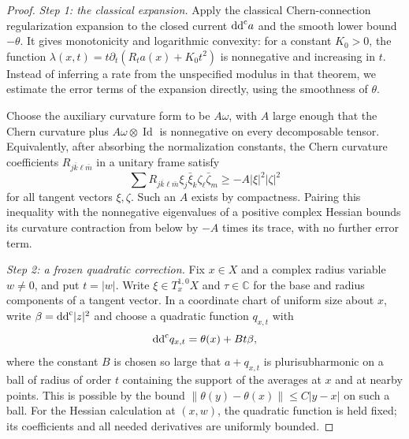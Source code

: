 \begin{proof}
\emph{Step 1: the classical expansion.} Apply the classical Chern-connection regularization expansion to the closed current $\mathrm{dd}^{\mathrm{c}} a$ and the smooth lower bound $-\theta$. It gives monotonicity and logarithmic convexity: for a constant $K_0>0$, the function $\lambda(x,t)=t\partial_t(R_ta(x)+K_0t^2)$ is nonnegative and increasing in $t$. Instead of inferring a rate from the unspecified modulus in that theorem, we estimate the error terms of the expansion directly, using the smoothness of $\theta$.

Choose the auxiliary curvature form to be $A\omega$, with $A$ large enough that the Chern curvature plus $A\omega\otimes\operatorname{Id}$ is nonnegative on every decomposable tensor. Equivalently, after absorbing the normalization constants, the Chern curvature coefficients $R_{j\bar k\ell\bar m}$ in a unitary frame satisfy
\[
 \sum R_{j\bar k\ell\bar m}\xi_j\bar\xi_k\zeta_\ell\bar\zeta_m
 \geq-A|\xi|^2|\zeta|^2
\]
for all tangent vectors $\xi,\zeta$. Such an $A$ exists by compactness. Pairing this inequality with the nonnegative eigenvalues of a positive complex Hessian bounds its curvature contraction from below by $-A$ times its trace, with no further error term.

\emph{Step 2: a frozen quadratic correction.} Fix $x\in X$ and a complex radius variable $w\ne0$, and put $t=|w|$. Write $\xi\in T_x^{1,0}X$ and $\tau\in\mathbb C$ for the base and radius components of a tangent vector. In a coordinate chart of uniform size about $x$, write $\beta=\mathrm{dd}^{\mathrm{c}}|z|^2$ and choose a quadratic function $q_{x,t}$ with
\[
 \mathrm{dd}^{\mathrm{c}} q_{x,t}=\theta(x)+Bt\beta,
\]
where the constant $B$ is chosen so large that $a+q_{x,t}$ is plurisubharmonic on a ball of radius of order $t$ containing the support of the averages at $x$ and at nearby points. This is possible by the bound $\|\theta(y)-\theta(x)\|\leq C|y-x|$ on such a ball. For the Hessian calculation at $(x,w)$, the quadratic function is held fixed; its coefficients and all needed derivatives are uniformly bounded.


\end{proof}
